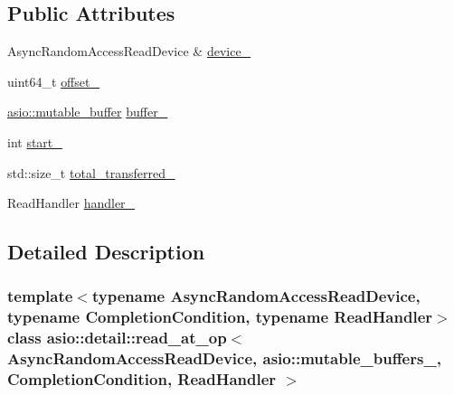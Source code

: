 \subsection*{Public Attributes}
\begin{DoxyCompactItemize}
\item 
Async\+Random\+Access\+Read\+Device \& \hyperlink{classasio_1_1detail_1_1read__at__op_3_01_async_random_access_read_device_00_01_01_01_01_01_01_01ccd5681b695707fee491134502088d0f_a8904fc007449d739e945aabb04570824}{device\+\_\+}
\item 
uint64\+\_\+t \hyperlink{classasio_1_1detail_1_1read__at__op_3_01_async_random_access_read_device_00_01_01_01_01_01_01_01ccd5681b695707fee491134502088d0f_a7439223be290258cf446fbf15cd20ec9}{offset\+\_\+}
\item 
\hyperlink{classasio_1_1mutable__buffer}{asio\+::mutable\+\_\+buffer} \hyperlink{classasio_1_1detail_1_1read__at__op_3_01_async_random_access_read_device_00_01_01_01_01_01_01_01ccd5681b695707fee491134502088d0f_a76cc1be81c32b0a78dcb5c6122d50a6c}{buffer\+\_\+}
\item 
int \hyperlink{classasio_1_1detail_1_1read__at__op_3_01_async_random_access_read_device_00_01_01_01_01_01_01_01ccd5681b695707fee491134502088d0f_ae1d78219c7c76c7bca90c985c4a37128}{start\+\_\+}
\item 
std\+::size\+\_\+t \hyperlink{classasio_1_1detail_1_1read__at__op_3_01_async_random_access_read_device_00_01_01_01_01_01_01_01ccd5681b695707fee491134502088d0f_a196b6aa951a048da2a0e73292dba5468}{total\+\_\+transferred\+\_\+}
\item 
Read\+Handler \hyperlink{classasio_1_1detail_1_1read__at__op_3_01_async_random_access_read_device_00_01_01_01_01_01_01_01ccd5681b695707fee491134502088d0f_af4dc43c4527cb81329def10f32a738d4}{handler\+\_\+}
\end{DoxyCompactItemize}


\subsection{Detailed Description}
\subsubsection*{template$<$typename Async\+Random\+Access\+Read\+Device, typename Completion\+Condition, typename Read\+Handler$>$class asio\+::detail\+::read\+\_\+at\+\_\+op$<$ Async\+Random\+Access\+Read\+Device,                           asio\+::mutable\+\_\+buffers\+\_, Completion\+Condition, Read\+Handler $>$}



